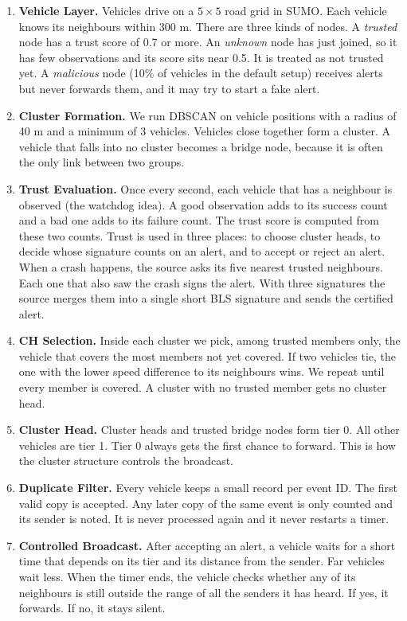 \documentclass[11pt, a4paper]{article}
\begin{document}
\begin{enumerate}[leftmargin=*, itemsep=3pt, topsep=2pt]
    \item \textbf{Vehicle Layer.} Vehicles drive on a $5\times5$ road grid in SUMO. Each vehicle knows its neighbours within 300 m. There are three kinds of nodes. A \emph{trusted} node has a trust score of 0.7 or more. An \emph{unknown} node has just joined, so it has few observations and its score sits near 0.5. It is treated as not trusted yet. A \emph{malicious} node (10\% of vehicles in the default setup) receives alerts but never forwards them, and it may try to start a fake alert.
    \item \textbf{Cluster Formation.} We run DBSCAN on vehicle positions with a radius of 40 m and a minimum of 3 vehicles. Vehicles close together form a cluster. A vehicle that falls into no cluster becomes a bridge node, because it is often the only link between two groups.
    \item \textbf{Trust Evaluation.} Once every second, each vehicle that has a neighbour is observed (the watchdog idea). A good observation adds to its success count and a bad one adds to its failure count. The trust score is computed from these two counts. Trust is used in three places: to choose cluster heads, to decide whose signature counts on an alert, and to accept or reject an alert. When a crash happens, the source asks its five nearest trusted neighbours. Each one that also saw the crash signs the alert. With three signatures the source merges them into a single short BLS signature and sends the certified alert.
    \item \textbf{CH Selection.} Inside each cluster we pick, among trusted members only, the vehicle that covers the most members not yet covered. If two vehicles tie, the one with the lower speed difference to its neighbours wins. We repeat until every member is covered. A cluster with no trusted member gets no cluster head.
    \item \textbf{Cluster Head.} Cluster heads and trusted bridge nodes form tier 0. All other vehicles are tier 1. Tier 0 always gets the first chance to forward. This is how the cluster structure controls the broadcast.
    \item \textbf{Duplicate Filter.} Every vehicle keeps a small record per event ID. The first valid copy is accepted. Any later copy of the same event is only counted and its sender is noted. It is never processed again and it never restarts a timer.
    \item \textbf{Controlled Broadcast.} After accepting an alert, a vehicle waits for a short time that depends on its tier and its distance from the sender. Far vehicles wait less. When the timer ends, the vehicle checks whether any of its neighbours is still outside the range of all the senders it has heard. If yes, it forwards. If no, it stays silent.

\end{enumerate}
\end{document}
